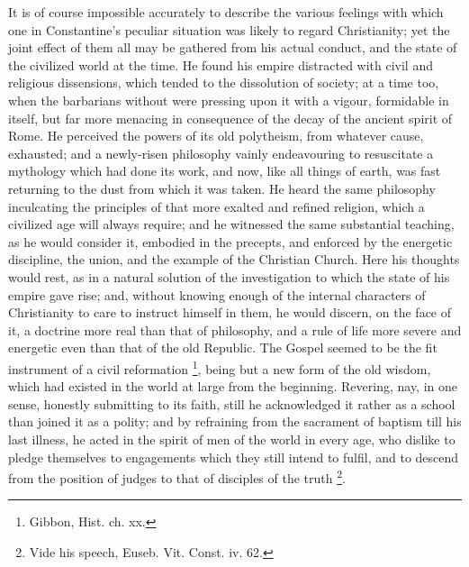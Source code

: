 It is of course impossible accurately to describe the various
feelings with which one in Constantine's peculiar situation was likely
to regard Christianity; yet the joint effect of them all may be
gathered from his actual conduct, and the state of the civilized world
at the time. He found his empire distracted with civil and religious
dissensions, which tended to the dissolution of society; at a time
too, when the barbarians without were pressing upon it with a vigour,
formidable in itself, but far more menacing in consequence of the
decay of the ancient spirit of Rome. He perceived the powers of its
old polytheism, from whatever cause, exhausted; and a newly-risen
philosophy vainly endeavouring to resuscitate a mythology which
had done its work, and now, like all things of earth, was fast
returning to the dust from which it was taken. He heard the same
philosophy inculcating the principles of that more exalted and refined
religion, which a civilized age will always require; and he witnessed
the same substantial teaching, as he would consider it, embodied in
the precepts, and enforced by the energetic discipline, the union, and
the example of the Christian Church. Here his thoughts would rest, as
in a natural solution of the investigation to which the state of his
empire gave rise; and, without knowing enough of the internal
characters of Christianity to care to instruct himself in them, he
would discern, on the face of it, a doctrine more real than that of
philosophy, and a rule of life more severe and energetic even than
that of the old Republic. The Gospel seemed to be the fit instrument
of a civil reformation \footnote{Gibbon, Hist. ch. xx.},
being but a new form of the old wisdom, which had existed in the world
at large from the beginning. Revering, nay, in one sense, honestly
submitting to its faith, still he acknowledged it rather as a school
than joined it as a polity; and by refraining from the sacrament of
baptism till his last illness, he acted in the spirit of men of the
world in every age, who dislike to pledge themselves to engagements
which they still intend to fulfil, and to descend from the position of
judges to that of disciples of the truth \footnote{Vide his speech, Euseb. Vit. Const. iv. 62.}.

